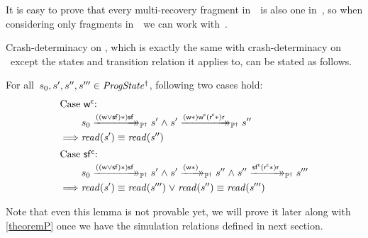 It is easy to prove that every multi-recovery fragment in~\Prog\ is also one in~\ProgInv, so when considering only fragments in~\Prog\ we can work with~\ProgInv.

Crash-determinacy on \ProgInv, which is exactly the same with crash-determinacy on \Prog\ except the states and transition relation it applies to, can be stated as follows.
\begin{lemma} \label{theoremPI}
	For all~$s_0, s', s'', s''' \in \mathit{ProgState^\dagger}$, following two cases hold:
\begin{align*}
	\intertext{Case $\actwc$:}
	&s_0 \ttsPI{\i{((\actw \lor \actf)\ast)} \actf} s' \conj s' \ttsPI{\i{(\actw\ast)} \actwc \i{(\actrc\ast)} \actr} s'' \\
	\implies & \i{read(s')} \equiv \i{read(s'')} \\
	\intertext{Case $\actfc$:}
	& s_0 \ttsPI{\i{((\actw \lor \actf)\ast)} \actf} s' \conj s' \ttsPI{\i(\actw \ast)} s'' \conj s'' \ttsPI{\actfc \i{(\actrc \ast)} \actr} s''' \\
	\implies &\i{read(s')} \equiv \i{read(s''')} \disj \i{read(s'')} \equiv \i{read(s''')}
\end{align*}
\end{lemma}
Note that even this lemma is not provable yet, we will prove it later along with \cref{theoremP} once we have the simulation relations defined in next section.
